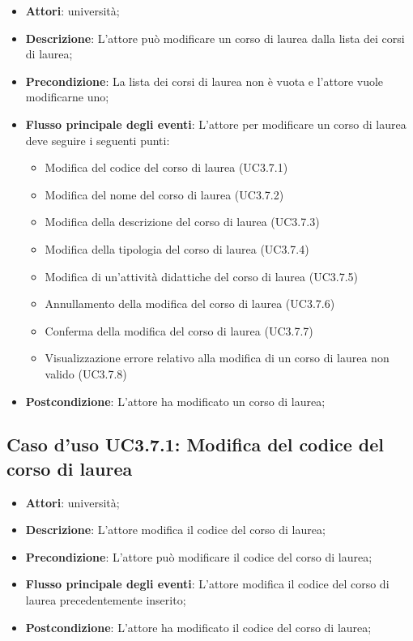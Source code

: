 \begin{itemize}
\item \textbf{Attori}: università;
\item \textbf{Descrizione}: L'attore può modificare un corso di laurea dalla lista dei corsi di laurea;

\item \textbf{Precondizione}: La lista dei corsi di laurea non è vuota e l'attore vuole modificarne uno;

\item \textbf{Flusso principale degli eventi}: L'attore per modificare un corso di laurea deve seguire i seguenti punti:

\begin{itemize}
\item Modifica del codice del corso di laurea (UC3.7.1)
\item Modifica del nome del corso di laurea (UC3.7.2)
\item Modifica della descrizione del corso di laurea (UC3.7.3)
\item Modifica della tipologia del corso di laurea (UC3.7.4)
\item Modifica di un'attività didattiche del corso di laurea (UC3.7.5)
\item Annullamento della modifica del corso di laurea (UC3.7.6)
\item Conferma della modifica del corso di laurea (UC3.7.7)
\item Visualizzazione errore relativo alla modifica di un corso di laurea non valido (UC3.7.8)
\end{itemize}
\item \textbf{Postcondizione}: L'attore ha modificato un corso di laurea;

\end{itemize}
\subsection{Caso d'uso \texorpdfstring{UC3.7.1}{UC3.7.1}: Modifica del codice del corso di laurea}
\begin{itemize}
\item \textbf{Attori}: università;
\item \textbf{Descrizione}: L'attore modifica il codice del corso di laurea;

\item \textbf{Precondizione}: L'attore può modificare il codice del corso di laurea;

\item \textbf{Flusso principale degli eventi}: L'attore modifica il codice del corso di laurea precedentemente inserito;

\item \textbf{Postcondizione}: L'attore ha modificato il codice del corso di laurea;

\end{itemize}
